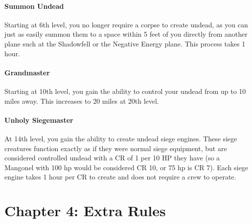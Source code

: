\documentclass[10pt,twoside,twocolumn,openany]{book}
\begin{document}
\subsubsection{Summon Undead}
Starting at 6th level, you no longer require a corpse to create undead, as you can just as easily summon them to a space within 5 feet of you directly from another plane such at the Shadowfell or the Negative Energy plane. This process takes 1 hour.

\subsubsection{Grandmaster}
Starting at 10th level, you gain the ability to control your undead from up to 10 miles away. This increases to 20 miles at 20th level.

\subsubsection{Unholy Siegemaster}
At 14th level, you gain the ability to create undead siege engines. These siege creatures function exactly as if they were normal siege equipment, but are considered controlled undead with a CR of 1 per 10 HP they have (so a Mangonel with 100 hp would be considered CR 10, or 75 hp is CR 7). Each siege engine takes 1 hour per CR to create and does not require a crew to operate.

\chapter{Chapter 4: Extra Rules}
\end{document}

